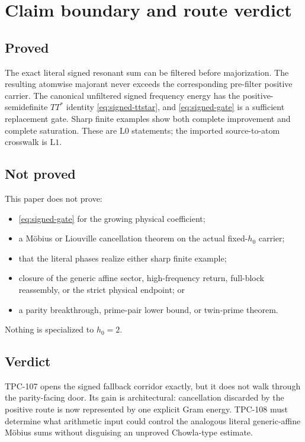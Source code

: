 \documentclass[11pt]{article}
\theoremstyle{remark}
\newcommand{\Lzero}{\mathrm{L0}}
\newcommand{\Lone}{\mathrm{L1}}
\begin{document}
\section{Claim boundary and route verdict}

\subsection*{Proved}

The exact literal signed resonant sum can be filtered before
majorization.  The resulting atomwise majorant never exceeds the
corresponding pre-filter positive carrier.  The canonical unfiltered
signed frequency energy has the positive-semidefinite \(TT^*\) identity
\eqref{eq:signed-ttstar}, and
\eqref{eq:signed-gate} is a sufficient replacement gate.  Sharp
finite examples show both complete improvement and complete
saturation.  These are \(\Lzero\) statements; the imported
source-to-atom crosswalk is \(\Lone\).

\subsection*{Not proved}

This paper does not prove:
\begin{itemize}[leftmargin=2em]
\item \eqref{eq:signed-gate} for the growing physical coefficient;
\item a M\"obius or Liouville cancellation theorem on the actual
fixed-\(h_0\) carrier;
\item that the literal phases realize either sharp finite example;
\item closure of the generic affine sector, high-frequency return,
full-block reassembly, or the strict physical endpoint; or
\item a parity breakthrough, prime-pair lower bound, or twin-prime
theorem.
\end{itemize}
Nothing is specialized to \(h_0=2\).

\subsection*{Verdict}

TPC-107 opens the signed fallback corridor exactly, but it does not
walk through the parity-facing door.  Its gain is architectural:
cancellation discarded by the positive route is now represented by
one explicit Gram energy.  TPC-108 must determine what arithmetic
input could control the analogous literal generic-affine
M\"obius sums without disguising an unproved Chowla-type estimate.

\begingroup
\footnotesize
\raggedright


\endgroup
\end{document}
